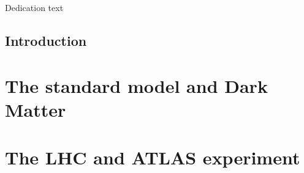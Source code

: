 \documentclass[11pt,openright,oneside,letterpaper,onecolumn]{report}  %
\begin{document}
\pagestyle{empty}

\thesistitlepage
\thesiscopyrightpage

\thesisabstract


\pagestyle{plain}

\setlength{\footskip}{0.5in}

\setcounter{tocdepth}{2}
\renewcommand{\contentsname}{Table of Contents}
\tableofcontents
\cleardoublepage

\listoffigures
\cleardoublepage

\listoftables
\cleardoublepage


\cleardoublepage

\thispagestyle{plain}
\strut \vfill
\centerline{\LARGE
Dedication text
}
\vfill \strut
\cleardoublepage


\pagestyle{headings}

%
%
\setlength{\textheight}{8.5in}
\setlength{\footskip}{0in}

 {%
\fancyhf{}
\fancyhead[LE,RO]{\thepage}
\fancyhead[RE,LO]{\itshape \leftmark}
\renewcommand{\headrulewidth}{0pt}
}
\pagestyle{plain}

\chapter{Introduction}
\label{section:introduction}


\part{The standard model and Dark Matter}
\label{sec:corpus}


\part{The LHC and ATLAS experiment}
\label{sec:corpus}

\end{document}
